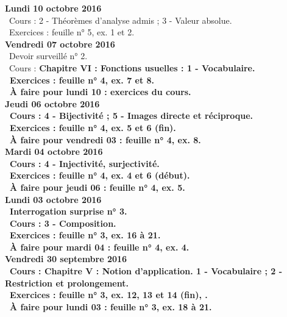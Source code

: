 \documentclass[12pt,a4paper]{article}
\begin{document}
\noindent\textbf{Lundi 10 octobre 2016}\\
\bu\ Cours :  2 - Théorèmes d'analyse admis ; 3 - Valeur absolue.\\
\bu\ Exercices : feuille n° 5, ex. 1 et 2.\vspace{.4cm}\\
   
\noindent\textbf{Vendredi 07 octobre 2016}\\
\bu\ Devoir surveillé n° 2.\\
\bu\ Cours : \bf Chapitre VI \rm : Fonctions usuelles : 1 - Vocabulaire.\\
\bu\ Exercices : feuille n° 4, ex. 7 et 8.\\
\bu\ À faire pour lundi 10 : exercices du cours.\vspace{.4cm}\\

\noindent\textbf{Jeudi 06 octobre 2016}\\
\bu\ Cours : 4 - Bijectivité ; 5 - Images directe et réciproque.\\
\bu\ Exercices : feuille n° 4, ex. 5 et 6 (fin).\\
\bu\ À faire pour vendredi 03 : feuille n° 4, ex. 8.\vspace{.4cm}\\

\noindent\textbf{\bf Mardi 04 octobre 2016}\\
\bu\ Cours : 4 - Injectivité, surjectivité.\\
\bu\ Exercices : feuille n° 4, ex. 4 et 6 (début).\\
\bu\ À faire pour jeudi 06 : feuille n° 4, ex. 5.\vspace{.4cm}\\

\noindent\textbf{Lundi 03 octobre 2016}\\
\bu\ Interrogation surprise n° 3.\\
\bu\ Cours : 3 - Composition.\\
\bu\ Exercices : feuille n° 3, ex. 16 à 21.\\
\bu\ À faire pour mardi 04 : feuille n° 4, ex. 4.\vspace{.4cm}\\
  
\noindent\textbf{Vendredi 30 septembre 2016}\\
\bu\ Cours : \bf Chapitre V \rm : Notion d'application. 1 - Vocabulaire ; 2 - Restriction et prolongement.\\
\bu\ Exercices : feuille n° 3, ex. 12, 13 et 14 (fin), .\\
\bu\ À faire pour lundi 03 : feuille n° 3, ex. 18 à 21.\vspace{.4cm}\\
\end{document}
